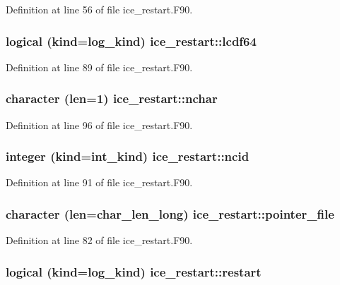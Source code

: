 Definition at line 56 of file ice\_\-restart.F90.\hypertarget{namespaceice__restart_aab78d8960dc993e85a64bb42c7031faf}{
\subsubsection[{lcdf64}]{\setlength{\rightskip}{0pt plus 5cm}logical (kind=log\_\-kind) {\bf ice\_\-restart::lcdf64}}}
\label{namespaceice__restart_aab78d8960dc993e85a64bb42c7031faf}


Definition at line 89 of file ice\_\-restart.F90.\hypertarget{namespaceice__restart_a26947e34bc78295d6dad27b3b0295209}{
\subsubsection[{nchar}]{\setlength{\rightskip}{0pt plus 5cm}character (len=1) {\bf ice\_\-restart::nchar}}}
\label{namespaceice__restart_a26947e34bc78295d6dad27b3b0295209}


Definition at line 96 of file ice\_\-restart.F90.\hypertarget{namespaceice__restart_a51c2dfdd011da9a81944ec89a678cc41}{
\subsubsection[{ncid}]{\setlength{\rightskip}{0pt plus 5cm}integer (kind=int\_\-kind) {\bf ice\_\-restart::ncid}}}
\label{namespaceice__restart_a51c2dfdd011da9a81944ec89a678cc41}


Definition at line 91 of file ice\_\-restart.F90.\hypertarget{namespaceice__restart_a3c4214640f255c7d756076f72b205d0b}{
\subsubsection[{pointer\_\-file}]{\setlength{\rightskip}{0pt plus 5cm}character (len=char\_\-len\_\-long) {\bf ice\_\-restart::pointer\_\-file}}}
\label{namespaceice__restart_a3c4214640f255c7d756076f72b205d0b}


Definition at line 82 of file ice\_\-restart.F90.\hypertarget{namespaceice__restart_a929c8d9ca4d216b9f6b0e99e89e714fb}{
\subsubsection[{restart}]{\setlength{\rightskip}{0pt plus 5cm}logical (kind=log\_\-kind) {\bf ice\_\-restart::restart}}}
\label{namespaceice__restart_a929c8d9ca4d216b9f6b0e99e89e714fb}


